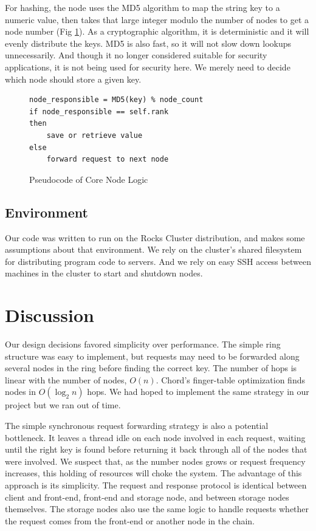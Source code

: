 \documentclass[11pt,conference]{IEEEtran}
\begin{document}
For hashing, the node uses the MD5 algorithm to map the string key to a numeric
value, then takes that large integer modulo the number of nodes to get a node
number (Fig \ref{fig:hash_algo}). As a cryptographic algorithm, it is
deterministic and it will evenly distribute the keys. MD5 is also
fast\cite{md5rfc}, so it will not slow down lookups unnecessarily. And though it
no longer considered suitable for security applications\cite{md5badrfc}, it is
not being used for security here. We merely need to decide which node should
store a given key.

\begin{figure}[h!]
\caption{Pseudocode of Core Node Logic}
\begin{lstlisting}
node_responsible = MD5(key) % node_count
if node_responsible == self.rank
then
    save or retrieve value
else
    forward request to next node
\end{lstlisting}
\label{fig:hash_algo}
\end{figure}


\subsection{Environment}

Our code was written to run on the Rocks Cluster distribution\cite{rocks}, and
makes some assumptions about that environment. We rely on the cluster's shared
filesystem for distributing program code to servers. And we rely on easy SSH
access between machines in the cluster to start and shutdown nodes.


\section{Discussion}

Our design decisions favored simplicity over performance. The simple ring
structure was easy to implement, but requests may need to be forwarded along
several nodes in the ring before finding the correct key. The number of hops is
linear with the number of nodes, $O(n)$. Chord's finger-table
optimization\cite{chord} finds nodes in $O(\log_2 n)$ hops. We had hoped to
implement the same strategy in our project but we ran out of time.

The simple synchronous request forwarding strategy is also a potential
bottleneck. It leaves a thread idle on each node involved in each request,
waiting until the right key is found before returning it back through all of the
nodes that were involved. We suspect that, as the number nodes grows or request
frequency increases, this holding of resources will choke the system. The
advantage of this approach is its simplicity. The request and response protocol
is identical between client and front-end, front-end and storage node, and
between storage nodes themselves. The storage nodes also use the same logic to
handle requests whether the request comes from the front-end or another node in
the chain.
\end{document}
